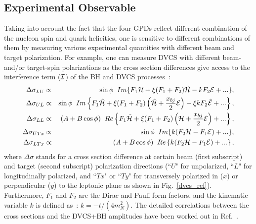 \subsection {Experimental Observable}
 Taking into account the fact that the four GPDs reflect different combination of the nucleon spin and quark helicities, one is sensitive to different combinations of them by measuring various experimental quantities with different beam and target polarization. For example, one can measure DVCS with different beam- and/or target-spin polarizations as the cross section differences give access to the interference term (${\cal I}$) of the BH and DVCS processes~\cite{Belitsky:2001ns, Gui03}:
 \begin{eqnarray}
  \Delta\sigma_{LU} &\propto& \sin\phi \;\; Im\{F_{1}{\cal H}+\xi(F_{1}+F_{2}) \tilde {\cal H}-kF_{2}{\cal E}+...\}, \label{eq:kirch1} \\
  \Delta\sigma_{UL} &\propto& \sin\phi \;\; Im\left\{F_{1}\tilde{\cal H}+\xi(F_{1}+F_{2})\left(\tilde{\cal H}+\frac{x_{bj}}{2}{\cal E}\right)-\xi kF_{2}\tilde{\cal E}+...\right\}, \label{eq:kirch2} \\
  \Delta\sigma_{LL} &\propto& (A+B\cos\phi) \;\;Re\left\{F_{1}\tilde{\cal H}+\xi(F_{1}+F_{2})\left({\cal H}+\frac{x_{bj}}{2}{\cal E}\right)+...\right\}, \label{eq:kirch3}\\
  \Delta\sigma_{UTx} &\propto& \sin\phi \;\; Im\{k(F_{2}{\cal H} -F_{1} {\cal E})+...\},  \label{eq:kirch4} \\
  \Delta\sigma_{LTx} &\propto& (A+B\cos\phi) \;\;Re\left\{k(F_{2}{\cal H} -F_{1} {\cal E})+...\right\}, \label{eq:kirch5}
 \end{eqnarray}
where $\Delta\sigma$ stands for a cross section difference at certain beam (first subscript) and target (second subscript) polarization directions (``$U$" for unpolarized, ``$L$" for longitudinally polarized, and ``$Tx$" or ``$Ty$" for transversely polarized in ($x$) or perpendicular ($y$) to the leptonic plane as shown in Fig.~\ref{dvcs_ref}). Furthermore, $F_{1}$ and $F_{2}$ are the Dirac and Pauli form factors, and the kinematic variable $k$ is defined as~: $k= -t / (4m_N^2)$. The detailed correlations between the cross sections and the DVCS+BH amplitudes have been worked out in Ref.~\cite{Belitsky:2001ns}.

